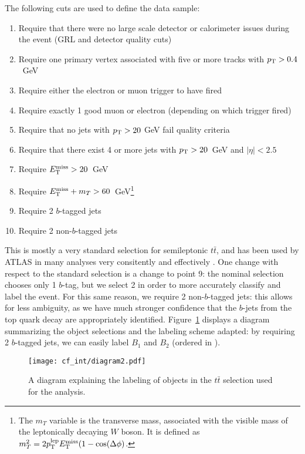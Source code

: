 The following cuts are used to define the data sample:
%
\begin{enumerate}
\item Require that there were no large scale detector or calorimeter issues during the event (GRL and detector quality cuts)
\item Require one primary vertex associated with five or more tracks with $p_{\text{T}} > 0.4$~GeV
\item Require either the electron or muon trigger to have fired
\item Require exactly 1 good muon or electron (depending on which trigger fired)
\item Require that no jets with $p_{\text{T}} > 20$ GeV fail quality criteria
\item Require that there exist 4 or more jets with $p_{\text{T}} > 20$~GeV and $|\eta| < 2.5$
\item Require $E_{\text{T}}^{\text{miss}} > 20$~GeV
\item Require $E_{\text{T}}^{\text{miss}} + m_T > 60$~GeV\footnote{The $m_T$ variable is the transverse mass, associated with the visible mass of the leptonically decaying $W$ boson. It is defined as $m_T^2 = 2 p_{\text{T}}^{\mathrm{lep}} E_{\text{T}}^{\text{miss}} (1 - \cos(\Delta \phi)$.}
\item Require 2 $b$-tagged jets
\item Require 2 non-$b$-tagged jets
\end{enumerate}
%
This is mostly a very standard selection for semileptonic $t\bar{t}$, and has been used by ATLAS in many analyses very consitently and effectively . One change with respect to the standard selection is a change to point 9: the nominal selection chooses only 1 $b$-tag, but we select 2 in order to more accurately classify and label the event. For this same reason, we require 2 non-$b$-tagged jets: this allows for less ambiguity, as we have much stronger confidence that the $b$-jets from the top quark decay are appropriately identified. Figure~\ref{fig:color:selection:labeling_diagram} displays a diagram summarizing the object selections and the labeling scheme adapted: by requiring 2 $b$-tagged jets, we can easily label $B_1$ and $B_2$ (ordered in \pt).


\begin{figure}
\centering
\texttt{[image: cf\_int/diagram2.pdf]}
\label{fig:color:selection:labeling_diagram}
\caption{A diagram explaining the labeling of objects in the $t\bar{t}$ selection used for the analysis.}
\end{figure}

